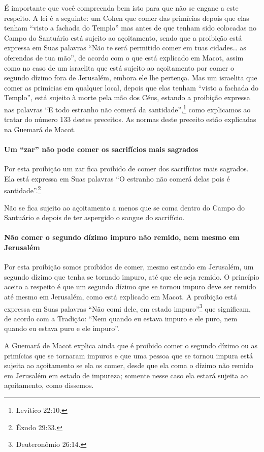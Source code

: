 É importante que você compreenda bem isto para que não se engane a este
respeito. A lei é a seguinte: um Cohen que comer das primícias
depois que elas tenham ``visto a fachada do Templo'' mas antes de que
tenham sido colocadas no Campo do Santuário está sujeito ao açoitamento,
sendo que a proibição está expressa em Suas palavras ``Não te será
permitido comer em tuas cidades\ldots{} as oferendas de tua mão'', de acordo
com o que está explicado em Macot, assim como no caso de um israelita
que está sujeito ao açoitamento por comer o segundo dízimo fora de
Jerusalém, embora ele lhe pertença. Mas um israelita que comer as
primícias em qualquer local, depois que elas tenham
``visto a fachada do Templo'', está sujeito à morte pela mão dos Céus,
estando
a proibição expressa nas palavras ``E todo estranho não comerá da
santidade'',\footnote{Levítico 22:10.} como explicamos ao tratar do número 133
destes preceitos.
As normas deste preceito estão explicadas na Guemará de Macot.

\paragraph{Um ``zar'' não pode comer os sacrifícios mais sagrados}

Por esta proibição um zar\starr{} fica proibido de
comer dos sacrifícios mais sagrados. Ela está expressa em Suas palavras
``O estranho não comerá delas pois é santidade''.\footnote{Êxodo 29:33.}

Não se fica sujeito ao açoitamento a menos que se coma dentro do Campo
do Santuário e depois de ter aspergido o sangue do sacrifício.

\paragraph{Não comer o segundo dízimo impuro não remido, nem mesmo em Jerusalém}

Por esta proibição somos proibidos de comer, mesmo estando em Jerusalém,
um segundo dízimo que tenha se tornado impuro, até que ele seja remido.
O princípio aceito a respeito é que um segundo dízimo que se tornou
impuro deve ser remido até mesmo em Jerusalém, como está explicado em
Macot. A proibição está expressa em Suas palavras ``Não comi dele, em
estado impuro''\footnote{Deuteronômio 26:14.} que significam, de acordo com a
Tradição: ``Nem quando eu estava impuro e ele puro, nem quando eu estava
puro e ele impuro''.

A Guemará de Macot explica ainda que é proibido comer o segundo dízimo
ou as primícias que se tornaram impuros e que uma pessoa que se tornou
impura está sujeita ao açoitamento se ela os comer, desde que ela coma o
dízimo não remido em Jerusalém em estado de impureza; somente nesse
caso ela estará sujeita ao açoitamento, como dissemos.

